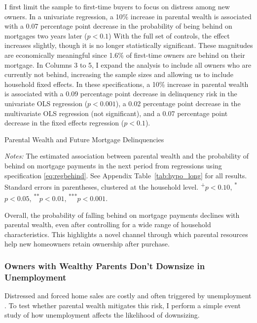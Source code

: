\documentclass[12pt]{article}
\begin{document}
I first limit the sample to first-time buyers to focus on distress among new owners. In a univariate regression, a 10\% increase in parental wealth is associated with a 0.07 percentage point decrease in the probability of being behind on mortgages two years later ($p<0.1$) With the full set of controls, the effect increases slightly, though it is no longer statistically significant. These magnitudes are economically meaningful since 1.6\% of first-time owners are behind on their mortgage. In Columns 3 to 5, I expand the analysis to include all owners who are currently not behind, increasing the sample sizes and allowing us to include household fixed effects. In these specifications, a 10\% increase in parental wealth is associated with a 0.09 percentage point decrease in delinquency risk in the univariate OLS regression ($p<0.001$), a 0.02 percentage point decrease in the multivariate OLS regression (not significant), and a 0.07 percentage point decrease in the fixed effects regression ($p<0.1$).

\begin{table}
	\centering
	\begin{threeparttable}
		\caption{Parental Wealth and Future Mortgage Delinquencies}
		\label{tab:hypo}
		\small 
				
	
	\end{threeparttable}
	{\begin{footnotesize}\begin{flushleft}
		\textit{Notes:} The estimated association between parental wealth and the probability of behind on mortgage payments in the next period from regressions using specification \ref{eq:regbehind}. See Appendix Table~\ref{tab:hypo_long} for all results. Standard errors in parentheses, clustered at the household level. \textsuperscript{+}$p<0.10$, \textsuperscript{*}$p<0.05$, \textsuperscript{**}$p<0.01$, \textsuperscript{***}$p<0.001$.
		\end{flushleft}\end{footnotesize}}	
\end{table}

Overall, the probability of falling behind on mortgage payments declines with parental wealth, even after controlling for a wide range of household characteristics. This highlights a novel channel through which parental resources help new homeowners retain ownership after purchase.


\subsubsection{Owners with Wealthy Parents Don't Downsize in Unemployment}\label{sec:eventstudy}
Distressed and forced home sales are costly and often triggered by unemployment \citep{kermani2021racial,hsu2018unemployment}. To test whether parental wealth mitigates this risk, I perform a simple event study of how unemployment affects the likelihood of downsizing.
\end{document}
